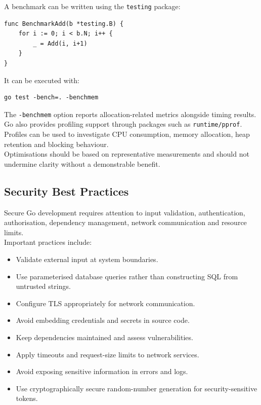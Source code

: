 A benchmark can be written using the \texttt{testing} package:

\begin{lstlisting}
func BenchmarkAdd(b *testing.B) {
    for i := 0; i < b.N; i++ {
        _ = Add(i, i+1)
    }
}
\end{lstlisting}

It can be executed with:

\begin{lstlisting}
go test -bench=. -benchmem
\end{lstlisting}

The \texttt{-benchmem} option reports allocation-related metrics alongside timing results.\\

Go also provides profiling support through packages such as \texttt{runtime/pprof}. Profiles can be used to investigate CPU consumption, memory allocation, heap retention and blocking behaviour.\\

Optimisations should be based on representative measurements and should not undermine clarity without a demonstrable benefit.

\subsection{Security Best Practices}

Secure Go development requires attention to input validation, authentication, authorisation, dependency management, network communication and resource limits.\\

Important practices include:

\begin{itemize}
    \item Validate external input at system boundaries.
    \item Use parameterised database queries rather than constructing SQL from untrusted strings.
    \item Configure TLS appropriately for network communication.
    \item Avoid embedding credentials and secrets in source code.
    \item Keep dependencies maintained and assess vulnerabilities.
    \item Apply timeouts and request-size limits to network services.
    \item Avoid exposing sensitive information in errors and logs.
    \item Use cryptographically secure random-number generation for security-sensitive tokens.
\end{itemize}

